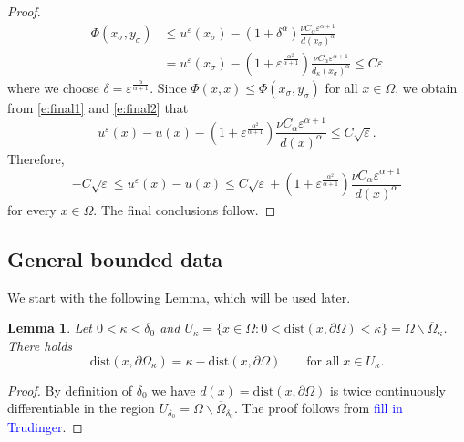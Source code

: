 \documentclass[11pt,reqno]{amsart}
\numberwithin{figure}{section}
\theoremstyle{plain}
\newtheorem{lem}[thm]{Lemma}
\theoremstyle{remark}
\numberwithin{equation}{section}
\begin{document}
\begin{proof}
\begin{align}
    \Phi(x_\sigma, y_\sigma) &\leq u^\varepsilon (x_\sigma)-\left(1+\delta^\alpha\right)\frac{\nu C_\alpha  \varepsilon^{\alpha+1}}{d(x_\sigma)^\alpha}\nonumber\\
    &= u^\varepsilon (x_\sigma)-\left(1+\varepsilon^{\frac{\alpha^2}{\alpha+1}}\right)\frac{\nu C_\alpha  \varepsilon^{\alpha+1}}{d_\kappa(x_\sigma)^\alpha}
    \leq C \varepsilon\label{e:final2}
\end{align}
where we choose $\delta = \varepsilon^{\frac{\alpha}{\alpha+1}}$. Since $\Phi(x,x) \leq \Phi(x_\sigma,y_\sigma)$ for all $x\in \Omega$, we obtain from \eqref{e:final1} and \eqref{e:final2} that
\begin{equation*}
    u^\varepsilon(x)-u(x)-\left(1+\varepsilon^{\frac{\alpha^2}{\alpha+1}}\right)\frac{\nu C_\alpha  \varepsilon^{\alpha+1}}{d(x)^\alpha} \leq C\sqrt{\varepsilon}.
\end{equation*}
Therefore,
\begin{equation}
   -C \sqrt{\varepsilon}\leq  u^\varepsilon(x) - u(x) \leq C\sqrt{\varepsilon} + \left(1+\varepsilon^{\frac{\alpha^2}{\alpha+1}}\right)\frac{\nu C_\alpha  \varepsilon^{\alpha+1}}{d(x)^\alpha} 
\end{equation}
for every $x\in \Omega$. The final conclusions follow.
\end{proof}

\subsection{General bounded data}




We start with the following Lemma, which will be used later.
\begin{lem} Let $0<\kappa < \delta_0$ and $U_\kappa = \big\{x\in \Omega: 0<\mathrm{dist}(x,\partial\Omega) < \kappa\big\} = \Omega\backslash \overline{\Omega}_\kappa$. There holds
\begin{equation*}
    \mathrm{dist}(x,\partial\Omega_\kappa) = \kappa - \mathrm{dist}(x,\partial\Omega) \qquad\text{for all}\;x\in U_\kappa.
\end{equation*}
\end{lem}

\begin{proof} By definition of $\delta_0$ we have $d(x) = \mathrm{dist}(x,\partial\Omega)$ is twice continuously differentiable in the region $U_{\delta_0} = \Omega\backslash \overline{\Omega}_{\delta_0}$. The proof follows from \textcolor{blue}{\cite{} fill in Trudinger}. 
\end{proof}
\end{document}
